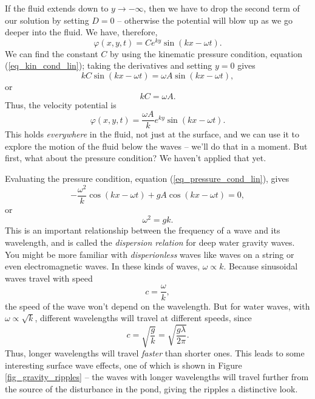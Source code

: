 If the fluid extends down to $y \to -\infty$, then we have to drop the second term of our solution by setting $D = 0$ -- otherwise the potential will blow up as we go deeper into the fluid.  We have, therefore, 
\[
\varphi(x, y, t) = C e^{ky} \sin (kx - \omega t).
\]
We can find the constant $C$ by using the kinematic pressure condition, equation (\ref{eq_kin_cond_lin}); taking the derivatives and setting $y = 0$ gives
\[
kC \sin(kx - \omega t) = \omega A \sin (kx - \omega t),
\]
or
\begin{equation}
kC = \omega A.
\end{equation}
Thus, the velocity potential is
\begin{equation}
\label{eq_sin_pot}
\varphi(x, y, t) = \frac{\omega A}{k} e^{ky} \sin (kx - \omega t).
\end{equation}
This holds \emph{everywhere} in the fluid, not just at the surface, and we can use it to explore the motion of the fluid below the waves -- we'll do that in a moment.  But first, what about the pressure condition?  We haven't applied that yet.

Evaluating the pressure condition, equation (\ref{eq_pressure_cond_lin}), gives
\[
-\frac{\omega^2}{k} \cos(kx - \omega t) + gA \cos(kx - \omega t) = 0,
\]
or
\begin{equation}
\label{eq_disp_relation}
\boxed{
\omega^2 = gk.
}
\end{equation}
This is an important relationship between the frequency of a wave and its wavelength, and is called the \emph{dispersion relation} for deep water gravity waves.  You might be more familiar with \emph{disperionless} waves like waves on a string or even electromagnetic waves.  In these kinds of waves, $\omega \propto k$.  Because sinusoidal waves travel with speed
\begin{equation}
c = \frac{\omega}{k},
\end{equation}
the speed of the wave won't depend on the wavelength.  But for water waves, with $\omega \propto \sqrt{k}$, different wavelengths will travel at different speeds, since
\[
c = \sqrt{\frac{g}{k}} = \sqrt{\frac{g\lambda}{2\pi}}.
\]
Thus, longer wavelengths will travel \emph{faster} than shorter ones.  This leads to some interesting surface wave effects, one of which is shown in Figure \ref{fig_gravity_ripples} -- the waves with longer wavelengths will travel further from the source of the disturbance in the pond, giving the ripples a distinctive look.


